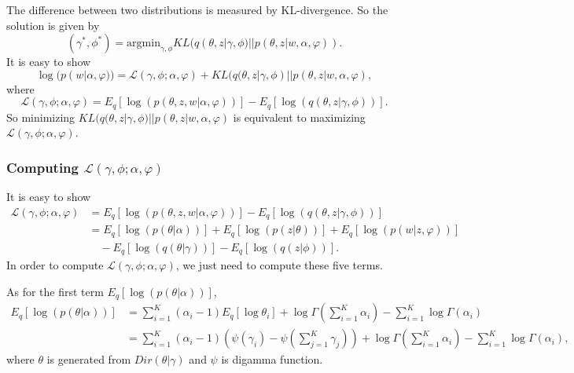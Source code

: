 \documentclass{article}
\begin{document}
The difference between two distributions is measured by KL-divergence. So the solution is given by
\begin{equation*}
	(\gamma^{\ast}, \phi^{\ast}) = \mathrm{argmin}_{\gamma,\phi} KL(q(\theta, z | \gamma, \phi) || p(\theta, z|w, \alpha, \varphi)).
\end{equation*}
It is easy to show
\begin{equation*}
	\log(p(w | \alpha, \varphi)) = \mathcal{L}(\gamma, \phi; \alpha, \varphi) + KL(q(\theta, z | \gamma, \phi) || p(\theta, z|w, \alpha, \varphi),
\end{equation*}
where
\begin{equation*}
	\mathcal{L}( \gamma, \phi; \alpha, \varphi) = E_q[\log(p(\theta, z, w | \alpha, \varphi))] - E_q[\log(q(\theta, z | \gamma, \phi))].
\end{equation*}
So minimizing $ KL(q(\theta, z | \gamma, \phi) || p(\theta, z|w, \alpha, \varphi) $ is equivalent to maximizing $ \mathcal{L}( \gamma, \phi; \alpha, \varphi) $.
\vspace{1em}

\subsubsection{Computing $ \mathcal{L}( \gamma, \phi; \alpha, \varphi) $}
It is easy to show
\begin{align*}
	\mathcal{L}( \gamma, \phi; \alpha, \varphi) &= E_q[\log(p(\theta, z, w | \alpha, \varphi))] - E_q[\log(q(\theta, z | \gamma, \phi))] \\
	&= E_q[\log(p(\theta | \alpha))] + E_q[\log(p(z | \theta))] + E_q[\log(p(w | z, \varphi))] \\
	&\quad - E_q[\log(q(\theta | \gamma))] - E_q[\log(q(z | \phi))].
\end{align*}
In order to compute $ \mathcal{L}( \gamma, \phi; \alpha, \varphi) $, we just need to compute these five terms.
\vspace{1em}

As for the first term $ E_q[\log(p(\theta | \alpha))] $,
\begin{align*}
	E_q[\log(p(\theta | \alpha))] &= \sum^{K}_{i=1}(\alpha_i - 1) E_q[\log \theta_i] + \log \Gamma(\sum^{K}_{i=1} \alpha_i) - \sum^{K}_{i=1}\log \Gamma(\alpha_i)\\
	&= \sum^{K}_{i=1}(\alpha_i - 1)(\psi(\gamma_i) - \psi(\sum^{K}_{j=1} \gamma_j)) + \log \Gamma(\sum^{K}_{i=1} \alpha_i) - \sum^{K}_{i=1}\log \Gamma(\alpha_i),
\end{align*}
where $ \theta $ is generated from $ Dir(\theta|\gamma) $ and $ \psi $ is digamma function.
\end{document}
